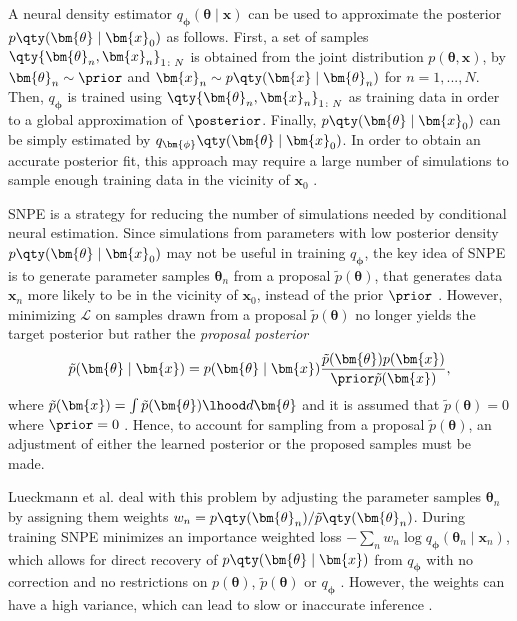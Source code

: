 A neural density estimator $q_{\bm{\phi}}(\bm{\theta} \mid \bm{x})$ can be used to approximate the posterior $p \qty(\bm{\theta}\mid \bm{x}_0)$ as follows. First, a set of samples $\qty{\bm{\theta}_n , \bm{x}_n}_{1\colon N}$ is obtained from the joint distribution $p (\bm{\theta}, \bm{x})$, by $\bm{\theta}_n \sim \prior$ and $\bm{x}_n \sim p \qty(\bm{x} \mid \bm{\theta}_n)$ for $n=1, ..., N$. Then, $q_{\bm{\phi}}$ is trained using $\qty{\bm{\theta}_n , \bm{x}_n}_{1\colon N}$ as training data in order to a global approximation of $\posterior$. Finally, $p \qty(\bm{\theta} \mid \bm{x}_0)$ can be simply estimated by $q_{\bm{\phi}} \qty(\bm{\theta} \mid \bm{x}_0)$. In order to obtain an accurate posterior fit, this approach may require a large number of simulations to sample enough training data in the vicinity of $\bm{x}_0$ \cite{SNL18}. 

SNPE is a strategy for reducing the number of simulations needed by conditional neural estimation. Since simulations from parameters with low posterior density $p \qty(\bm{\theta} \mid \bm{x}_0)$ may not be useful in training $q_{\bm{\phi}}$, the key idea of SNPE is to generate parameter samples $\bm{\theta}_n$ from a proposal $\tilde{p}(\bm{\theta})$, that generates data $\bm{x}_n$ more likely to be in the vicinity of $\bm{x}_0$,  instead of the prior $\prior$ \cite{SNL18}. However, minimizing $\mathcal{L}$ on samples drawn from a proposal $\tilde{p}(\bm{\theta})$ no longer yields the target posterior but rather the \textit{proposal posterior}
\begin{equation}
    \tilde{p}(\bm{\theta} \mid \bm{x}) = p (\bm{\theta} \mid \bm{x}) \frac{\tilde{p}(\bm{\theta}) p(\bm{x}) }{\prior \tilde{p}(\bm{x}) },
\end{equation}
where $\tilde{p}(\bm{x}) = \int \tilde{p} (\bm{\theta}) \lhood d\bm{\theta}$ and it is assumed that $\tilde{p} (\bm{\theta})=0$ where $\prior = 0$ \cite{apt}. Hence, to account for sampling from a proposal $\tilde{p}(\bm{\theta})$, an adjustment of either the learned posterior or the proposed samples must be made. 

Lueckmann et al. deal with this problem by adjusting the parameter samples $\bm{\theta}_n$ by assigning them weights $w_n = p \qty(\bm{\theta}_n)/ \tilde{p} \qty(\bm{\theta}_n)$. During training SNPE minimizes an importance weighted loss $- \sum_n w_n \log q_{\bm{\phi}}(\bm{\theta}_n \mid \bm{x}_n)$, which allows for direct recovery of $p \qty(\bm{\theta} \mid \bm{x})$ from $q_{\bm{\phi}}$ with no correction and no restrictions on $p(\bm{\theta})$, $\tilde{p}(\bm{\theta})$ or $q_{\bm{\phi}}$ \cite{apt}. However, the weights can have a high variance, which can lead to slow or inaccurate inference \cite{SNL18}.




